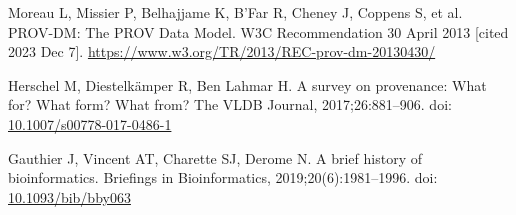 \documentclass[10pt,letterpaper]{article}
\begin{document}
%
%
% 
\begin{thebibliography}{10}

\setlength{\parskip}{6pt}
\setlength{\itemsep}{0pt plus 0.3ex}


\begin{small}










Moreau L, Missier P, Belhajjame K, B'Far R, Cheney J, Coppens S, et al.
PROV-DM: The PROV Data Model. W3C Recommendation 30 April 2013 [cited 2023 Dec 7].
\url{https://www.w3.org/TR/2013/REC-prov-dm-20130430/}

Herschel M, Diestelkämper R, Ben Lahmar H.
A survey on provenance: What for? What form? What from?
The VLDB Journal, 2017;26:881--906.
doi: \href{https://doi.org/10.1007/s00778-017-0486-1}{10.1007/s00778-017-0486-1}

Gauthier J, Vincent AT, Charette SJ, Derome N.
A brief history of bioinformatics.
Briefings in Bioinformatics, 2019;20(6):1981--1996.
doi: \href{https://doi.org/10.1093/bib/bby063}{10.1093/bib/bby063}


\end{small}
\end{thebibliography}
\end{document}
